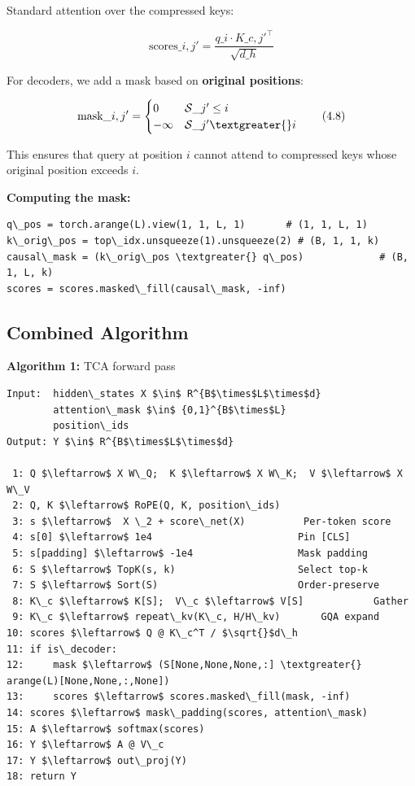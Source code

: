 Standard attention over the compressed keys:

\[
\text{scores}\_{i, j'} = \frac{q\_i \cdot K\_{c, j'}^\top}{\sqrt{d\_h}}
\tag{4.7}
\]

For decoders, we add a mask based on \textbf{original positions}:

\[
\text{mask}\_{i, j'} = \begin{cases} 0 & \mathcal{S}\_{j'} \leq i \\ -\infty & \mathcal{S}\_{j'} \textgreater{} i \end{cases}
\tag{4.8}
\]

This ensures that query at position $i$ cannot attend to compressed keys 
whose original position exceeds $i$.

\textbf{Computing the mask:}

\begin{lstlisting}
q\_pos = torch.arange(L).view(1, 1, L, 1)       # (1, 1, L, 1)
k\_orig\_pos = top\_idx.unsqueeze(1).unsqueeze(2) # (B, 1, 1, k)
causal\_mask = (k\_orig\_pos \textgreater{} q\_pos)             # (B, 1, L, k)
scores = scores.masked\_fill(causal\_mask, -inf)
\end{lstlisting}

\subsection{Combined Algorithm}

\textbf{Algorithm 1:} TCA forward pass
\begin{lstlisting}
Input:  hidden\_states X $\in$ R^{B$\times$L$\times$d}
        attention\_mask $\in$ {0,1}^{B$\times$L}
        position\_ids
Output: Y $\in$ R^{B$\times$L$\times$d}

 1: Q $\leftarrow$ X W\_Q;  K $\leftarrow$ X W\_K;  V $\leftarrow$ X W\_V
 2: Q, K $\leftarrow$ RoPE(Q, K, position\_ids)
 3: s $\leftarrow$  X \_2 + score\_net(X)          Per-token score
 4: s[0] $\leftarrow$ 1e4                         Pin [CLS]
 5: s[padding] $\leftarrow$ -1e4                  Mask padding
 6: S $\leftarrow$ TopK(s, k)                     Select top-k
 7: S $\leftarrow$ Sort(S)                        Order-preserve
 8: K\_c $\leftarrow$ K[S];  V\_c $\leftarrow$ V[S]            Gather
 9: K\_c $\leftarrow$ repeat\_kv(K\_c, H/H\_kv)       GQA expand
10: scores $\leftarrow$ Q @ K\_c^T / $\sqrt{}$d\_h
11: if is\_decoder:
12:     mask $\leftarrow$ (S[None,None,None,:] \textgreater{} arange(L)[None,None,:,None])
13:     scores $\leftarrow$ scores.masked\_fill(mask, -inf)
14: scores $\leftarrow$ mask\_padding(scores, attention\_mask)
15: A $\leftarrow$ softmax(scores)
16: Y $\leftarrow$ A @ V\_c
17: Y $\leftarrow$ out\_proj(Y)
18: return Y
\end{lstlisting}

